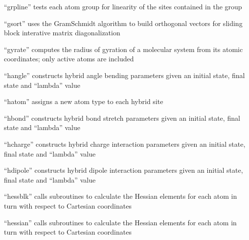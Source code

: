 \documentclass[letterpaper,11pt,english]{sphinxmanual}
\begin{document}
\sphinxAtStartPar
{}

\sphinxAtStartPar
“grpline” tests each atom group for linearity of the sites contained in the group

\sphinxAtStartPar
{}

\sphinxAtStartPar
“gsort” uses the Gram\sphinxhyphen{}Schmidt algorithm to build orthogonal vectors for sliding block interative matrix diagonalization

\sphinxAtStartPar
{}

\sphinxAtStartPar
“gyrate” computes the radius of gyration of a molecular system from its atomic coordinates; only active atoms are included

\sphinxAtStartPar
{}

\sphinxAtStartPar
“hangle” constructs hybrid angle bending parameters given an initial state, final state and “lambda” value

\sphinxAtStartPar
{}

\sphinxAtStartPar
“hatom” assigns a new atom type to each hybrid site

\sphinxAtStartPar
{}

\sphinxAtStartPar
“hbond” constructs hybrid bond stretch parameters given an initial state, final state and “lambda” value

\sphinxAtStartPar
{}

\sphinxAtStartPar
“hcharge” constructs hybrid charge interaction parameters given an initial state, final state and “lambda” value

\sphinxAtStartPar
{}

\sphinxAtStartPar
“hdipole” constructs hybrid dipole interaction parameters given an initial state, final state and “lambda” value

\sphinxAtStartPar
{}

\sphinxAtStartPar
“hessblk” calls subroutines to calculate the Hessian elements for each atom in turn with respect to Cartesian coordinates

\sphinxAtStartPar
{}

\sphinxAtStartPar
“hessian” calls subroutines to calculate the Hessian elements for each atom in turn with respect to Cartesian coordinates
\end{document}
